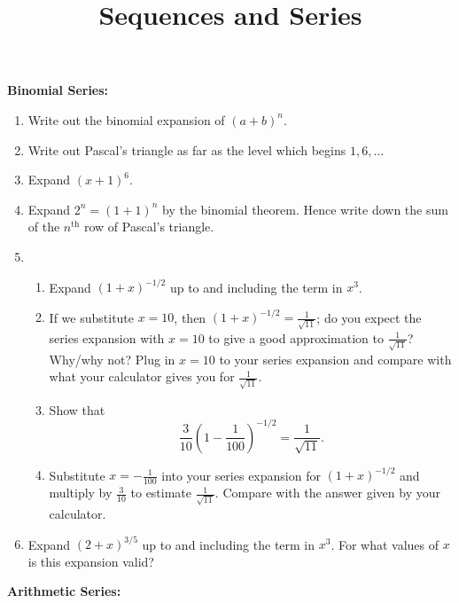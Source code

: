 \documentclass{article}
\begin{document}
\title{Sequences and Series}
\date{}

\maketitle
\thispagestyle{empty}

\Large





\textbf{Binomial Series:}

\vspace{5mm}


\begin{enumerate}
	\item Write out the binomial expansion of $(a+b)^n$.
	\item Write out Pascal's triangle as far as the level which begins $1,6,\hdots$
	\item Expand $(x+1)^6$.
	\item Expand $2^n=(1+1)^n$ by the binomial theorem. Hence write down the sum of the $n^\mathrm{th}$ row of Pascal's triangle.
	\item \begin{enumerate}
			\item Expand $(1+x)^{-1/2}$ up to and including the term in $x^3$.
			\item If we substitute $x=10$, then $(1+x)^{-1/2}=\frac{1}{\sqrt{11}}$; do you expect the series expansion with $x=10$ to give a good approximation to $\frac{1}{\sqrt{11}}$? Why/why not? Plug in $x=10$ to your series expansion and compare with what your calculator gives you for $\frac{1}{\sqrt{11}}$.
			\item Show that
				\[\frac{3}{10}\left(1-\frac{1}{100}\right)^{-1/2}=\frac{1}{\sqrt{11}}.\]
			\item Substitute $x=-\frac{1}{100}$ into your series expansion for $(1+x)^{-1/2}$ and multiply by $\frac{3}{10}$ to estimate $\frac{1}{\sqrt{11}}$. Compare with the answer given by your calculator.
		\end{enumerate}
	\item Expand $(2+x)^{3/5}$ up to and including the term in $x^3$. For what values of $x$ is this expansion valid?
\end{enumerate}



\clearpage




\textbf{Arithmetic Series:}\bigskip
\end{document}
